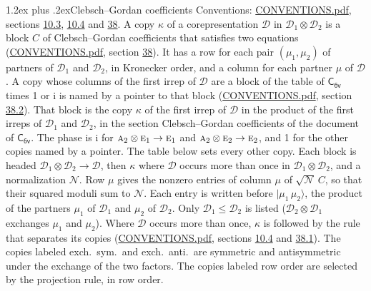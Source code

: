\documentclass[10pt,a4paper]{article}
\makeatletter
\renewcommand\section{\@startsection{section}{1}{\z@}{-3ex plus -1ex minus -.2ex}%
  {1.2ex plus .2ex}{\normalfont\large\sffamily\bfseries\color{parttitle}}}
\numberwithin{equation}{section}
\newcommand{\grp}[1]{\mathsf{#1}}
\newcommand{\irr}[1]{\text{\normalfont\scshape #1}}
\newcommand{\iunit}{\mathrm{i}}
\newcommand{\irrprod}{\otimes}
\newcommand{\mult}{\kappa}
\newcommand{\intx}{\mu}
\newcommand{\cgnorm}{\mathcal{N}}
\newcommand{\prodket}[2]{\lvert {#1}\,{#2}\rangle}
\makeatother
\begin{document}
\section{Clebsch--Gordan coefficients}\label{s:clebsch_gordan}
Conventions: \href{../../CONVENTIONS.pdf}{CONVENTIONS.pdf}, sections \href{../../../rotation/CONVENTIONS.pdf\#conv.10.3}{10.3}, \href{../../../rotation/CONVENTIONS.pdf\#conv.10.4}{10.4} and \href{../../CONVENTIONS.pdf\#conv.38}{38}.
\leavevmode\label{n:index.copy}\label{n:matrix.cg.stored}A copy $\mult$ of a corepresentation $\mathcal{D}$ in $\mathcal{D}_1\irrprod\mathcal{D}_2$ is a block $C$ of Clebsch--Gordan coefficients that satisfies two equations (\href{../../CONVENTIONS.pdf}{CONVENTIONS.pdf}, section \href{../../CONVENTIONS.pdf\#conv.38}{38}). \label{n:index.cg}It has a row for each pair $(\intx_1, \intx_2)$ of partners of $\mathcal{D}_1$ and $\mathcal{D}_2$, in Kronecker order, and a column for each partner $\intx$ of $\mathcal{D}$.
A copy whose columns of the first irrep of $\mathcal{D}$ are a block of the table of $\grp{C_{6v}}$ times 1 or $\iunit$ is named by a pointer to that block (\href{../../CONVENTIONS.pdf}{CONVENTIONS.pdf}, section \href{../../CONVENTIONS.pdf\#conv.38.2}{38.2}). That block is the copy $\mult$ of the first irrep of $\mathcal{D}$ in the product of the first irreps of $\mathcal{D}_1$ and $\mathcal{D}_2$, in the section Clebsch--Gordan coefficients of the document of \href{../../../rotation/data/pdf/C6v.pdf}{$\grp{C_{6v}}$}. The phase is $\iunit$ for $\irr{a}_{2}\irrprod \irr{e}_{1}\to \irr{e}_{1}$ and $\irr{a}_{2}\irrprod \irr{e}_{2}\to \irr{e}_{2}$, and 1 for the other copies named by a pointer. The table below sets every other copy.
Each block is headed $\mathcal{D}_1\irrprod\mathcal{D}_2\to\mathcal{D}$, then $\mult$ where $\mathcal{D}$ occurs more than once in $\mathcal{D}_1\irrprod\mathcal{D}_2$, and a normalization $\cgnorm$. Row $\intx$ gives the nonzero entries of column $\intx$ of $\sqrt{\cgnorm}\,C$, so that their squared moduli sum to $\cgnorm$. \label{n:vector.ket.product}Each entry is written before $\prodket{\intx_1}{\intx_2}$, the product of the partners $\intx_1$ of $\mathcal{D}_1$ and $\intx_2$ of $\mathcal{D}_2$. Only $\mathcal{D}_1 \le \mathcal{D}_2$ is listed ($\mathcal{D}_2\irrprod\mathcal{D}_1$ exchanges $\intx_1$ and $\intx_2$).
Where $\mathcal{D}$ occurs more than once, $\mult$ is followed by the rule that separates its copies (\href{../../CONVENTIONS.pdf}{CONVENTIONS.pdf}, sections \href{../../../rotation/CONVENTIONS.pdf\#conv.10.4}{10.4} and \href{../../CONVENTIONS.pdf\#conv.38.1}{38.1}). \label{n:abbreviation.exchange}The copies labeled exch.\ sym.\ and exch.\ anti.\ are symmetric and antisymmetric under the exchange of the two factors. The copies labeled row order are selected by the projection rule, in row order.
\end{document}
